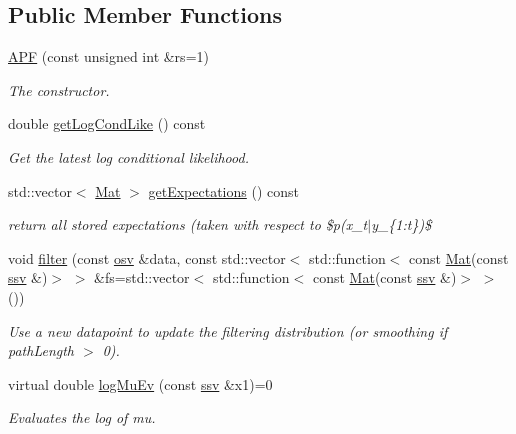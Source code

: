 \subsection*{Public Member Functions}
\begin{DoxyCompactItemize}
\item 
\hyperlink{classAPF_a71a3c866256e035884eefe72a9ade240}{A\+PF} (const unsigned int \&rs=1)
\begin{DoxyCompactList}\small\item\em The constructor. \end{DoxyCompactList}\item 
double \hyperlink{classAPF_a383dbe596d2a860e1e087cced1368769}{get\+Log\+Cond\+Like} () const 
\begin{DoxyCompactList}\small\item\em Get the latest log conditional likelihood. \end{DoxyCompactList}\item 
std\+::vector$<$ \hyperlink{classAPF_a8e867c46870835e2103aee00f13f0be7}{Mat} $>$ \hyperlink{classAPF_a327d05c2174c1c1f5b93ce6ff6fe8714}{get\+Expectations} () const 
\begin{DoxyCompactList}\small\item\em return all stored expectations (taken with respect to \$p(x\+\_\+t$\vert$y\+\_\+\{1\+:t\})\$ \end{DoxyCompactList}\item 
void \hyperlink{classAPF_a5ff850e7b12a3059564e22cb708e7793}{filter} (const \hyperlink{classAPF_aa3975009cab0e9e8945862884f091620}{osv} \&data, const std\+::vector$<$ std\+::function$<$ const \hyperlink{classAPF_a8e867c46870835e2103aee00f13f0be7}{Mat}(const \hyperlink{classAPF_add8c737c90d68dc165d1e60dcd6b3b20}{ssv} \&)$>$ $>$ \&fs=std\+::vector$<$ std\+::function$<$ const \hyperlink{classAPF_a8e867c46870835e2103aee00f13f0be7}{Mat}(const \hyperlink{classAPF_add8c737c90d68dc165d1e60dcd6b3b20}{ssv} \&)$>$ $>$())
\begin{DoxyCompactList}\small\item\em Use a new datapoint to update the filtering distribution (or smoothing if path\+Length $>$ 0). \end{DoxyCompactList}\item 
virtual double \hyperlink{classAPF_a6f58504e542c8153140750b7d1df0bd2}{log\+Mu\+Ev} (const \hyperlink{classAPF_add8c737c90d68dc165d1e60dcd6b3b20}{ssv} \&x1)=0
\begin{DoxyCompactList}\small\item\em Evaluates the log of mu. \end{DoxyCompactList}\item 

\end{DoxyCompactItemize}

